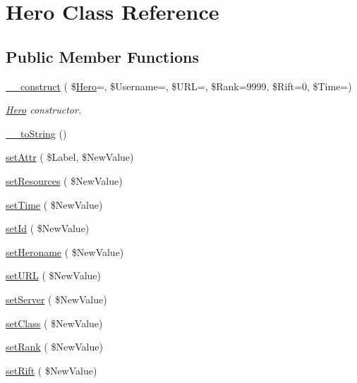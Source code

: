 \hypertarget{class_hero}{}\section{Hero Class Reference}
\label{class_hero}
\subsection*{Public Member Functions}
\begin{DoxyCompactItemize}
\item 
\hyperlink{class_hero_a8f3b4b60f444d9df9015dd01c9d594d9}{\+\_\+\+\_\+construct} ( \$\hyperlink{class_hero}{Hero}=\textquotesingle{}\textquotesingle{}, \$Username=\textquotesingle{}\textquotesingle{}, \$U\+RL=\textquotesingle{}\textquotesingle{}, \$Rank=9999, \$Rift=0, \$Time=\textquotesingle{}\textquotesingle{})
\begin{DoxyCompactList}\small\item\em \hyperlink{class_hero}{Hero} constructor. \end{DoxyCompactList}\item 
\hyperlink{class_hero_ae675b892a209f61bdc1a4db24a6487ef}{\+\_\+\+\_\+to\+String} ()
\item 
\hyperlink{class_hero_a4936f4afc1324ed3ae4a90a91fd16eb1}{set\+Attr} ( \$Label, \$New\+Value)
\item 
\hyperlink{class_hero_a136f0b99dae0a4f99d9e30193ee3972a}{set\+Resources} ( \$New\+Value)
\item 
\hyperlink{class_hero_ac0567d3179edcda779547013ffa8e3a8}{set\+Time} ( \$New\+Value)
\item 
\hyperlink{class_hero_ad092df134ab5a5201eacdb4d2db9a7bc}{set\+Id} ( \$New\+Value)
\item 
\hyperlink{class_hero_a10da7e23d594023bf7f2508bb41db1dd}{set\+Heroname} ( \$New\+Value)
\item 
\hyperlink{class_hero_a38ffcafb45800d2895a8bcf6ffde23e9}{set\+U\+RL} ( \$New\+Value)
\item 
\hyperlink{class_hero_a4b70e6c2741977f8561adf943606bdea}{set\+Server} ( \$New\+Value)
\item 
\hyperlink{class_hero_a25f381160b165cd5e6210d7c6b86062f}{set\+Class} ( \$New\+Value)
\item 
\hyperlink{class_hero_a28f6b0ed48c9046e2ed5929784884ac6}{set\+Rank} ( \$New\+Value)
\item 
\hyperlink{class_hero_a6fe63a5d6d2b9c2353b049492d443f64}{set\+Rift} ( \$New\+Value)
\item 

\end{DoxyCompactItemize}
